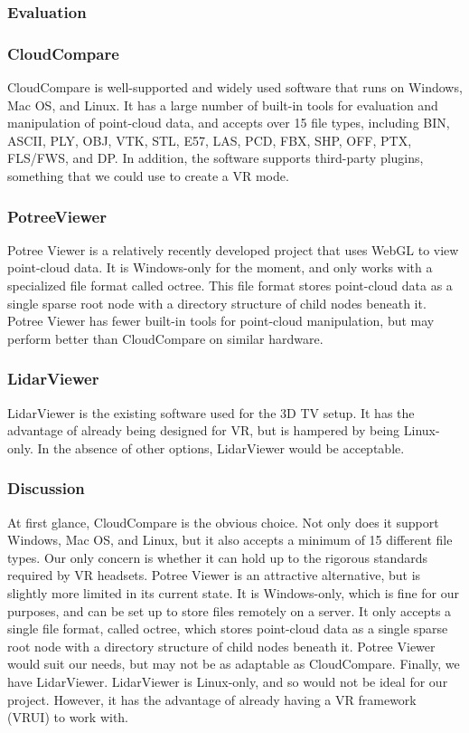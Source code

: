 \subsubsection{Evaluation}
\subsubsection{CloudCompare}
CloudCompare is well-supported and widely used software that runs on Windows, Mac OS, and Linux.
It has a large number of built-in tools for evaluation and manipulation of point-cloud data, and accepts over 15 file types, including BIN, ASCII, PLY, OBJ, VTK, STL, E57, LAS, PCD, FBX, SHP, OFF, PTX, FLS/FWS, and DP. 
In addition, the software supports third-party plugins, something that we could use to create a VR mode. 

\subsubsection{PotreeViewer}
Potree Viewer is a relatively recently developed project that uses WebGL to view point-cloud data.
It is Windows-only for the moment, and only works with a specialized file format called octree. 
This file format stores point-cloud data as a single sparse root node with a directory structure of child nodes beneath it. 
Potree Viewer has fewer built-in tools for point-cloud manipulation, but may perform better than CloudCompare on similar hardware. 

\subsubsection{LidarViewer}
LidarViewer is the existing software used for the 3D TV setup. It has the advantage of already being designed for VR, but is hampered by being Linux-only.
In the absence of other options, LidarViewer would be acceptable.

\subsubsection{Discussion}
At first glance, CloudCompare is the obvious choice. 
Not only does it support Windows, Mac OS, and Linux, but it also accepts a minimum of 15 different file types. 
Our only concern is whether it can hold up to the rigorous standards required by VR headsets. 
Potree Viewer is an attractive alternative, but is slightly more limited in its current state. 
It is Windows-only, which is fine for our purposes, and can be set up to store files remotely on a server. 
It only accepts a single file format, called octree, which stores point-cloud data as a single sparse root node with a directory structure of child nodes beneath it. 
Potree Viewer would suit our needs, but may not be as adaptable as CloudCompare. 
Finally, we have LidarViewer. LidarViewer is Linux-only, and so would not be ideal for our project. 
However, it has the advantage of already having a VR framework (VRUI) to work with.

